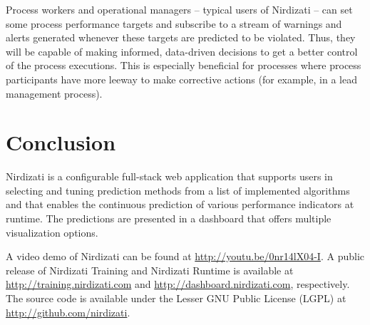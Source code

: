 \documentclass[runningheads,a4paper]{llncs}
\begin{document}
Process workers and operational managers -- typical users of Nirdizati -- can set some process performance targets and subscribe to a stream of warnings and alerts generated whenever these targets are predicted to be violated. Thus, they will be capable of making informed, data-driven decisions to get a better control of the process executions. This is especially beneficial for processes where process participants have more leeway to make corrective actions (for example, in a lead management process).

\section{Conclusion} \label{sec:conclusion}
Nirdizati is a configurable full-stack web application that supports users in selecting and tuning prediction methods from a list of implemented algorithms and that enables the continuous prediction of various performance indicators at runtime.
The predictions are presented in a dashboard that offers multiple visualization options.

A video demo of Nirdizati can be found at \url{http://youtu.be/0nr14lX04-I}. A public release of Nirdizati Training and Nirdizati Runtime is available at \url{http://training.nirdizati.com} and \url{http://dashboard.nirdizati.com}, respectively. The source code is available under the Lesser GNU Public License (LGPL) at \url{http://github.com/nirdizati}.


\end{document}
